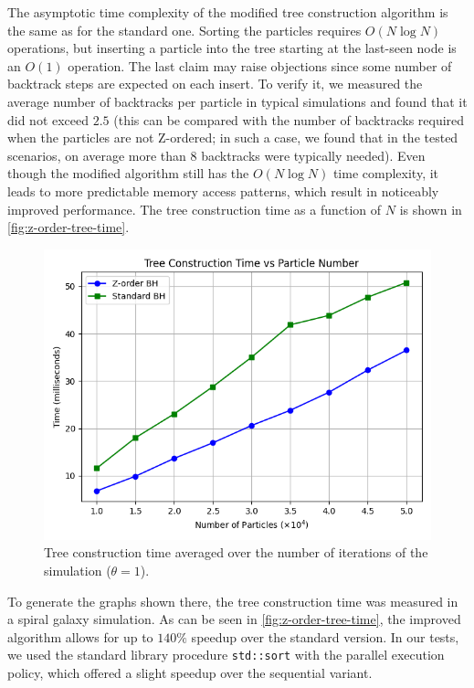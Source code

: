 The asymptotic time complexity of the modified tree construction algorithm is the same as for the standard one.
Sorting the particles requires $O(N\log N)$ operations, but inserting a particle into the tree starting at the last-seen node is an $O(1)$ operation.
The last claim may raise objections since some number of backtrack steps are expected on each insert.
To verify it, we measured the average number of backtracks per particle in typical simulations and found that it did not exceed $2.5$ (this can be compared with the number of backtracks required when the particles are not Z-ordered; in such a case, we found that in the tested scenarios, on average more than 8 backtracks were typically needed).
Even though the modified algorithm still has the $O(N\log N)$ time complexity, it leads to more predictable memory access patterns, which result in noticeably improved performance.
The tree construction time as a function of $N$ is shown in \autoref{fig:z-order-tree-time}.
\begin{figure}[htp]
    \centering
    \includegraphics[scale=0.5]{chapters/barnes-hut/img/tree_construction_time.png}
    \caption{Tree construction time averaged over the number of iterations of the simulation ($\theta = 1$).}
    \label{fig:z-order-tree-time}
\end{figure}
To generate the graphs shown there, the tree construction time was measured in a spiral galaxy simulation.
As can be seen in \autoref{fig:z-order-tree-time}, the improved algorithm allows for up to $140\%$ speedup over the standard version.
In our tests, we used the standard library procedure \texttt{std::sort} with the parallel execution policy, which offered a slight speedup over the sequential variant.